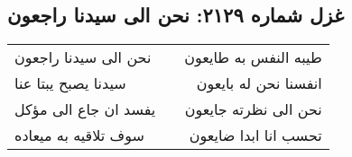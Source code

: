 \begin{center}
\section*{غزل شماره ۲۱۲۹: نحن الی سیدنا راجعون}
\label{sec:2129}
\begin{longtable}{l p{0.5cm} r}
نحن الی سیدنا راجعون
&&
طیبه النفس به طایعون
\\
سیدنا یصبح یبتا عنا
&&
انفسنا نحن له بایعون
\\
یفسد ان جاع الی مؤکل
&&
نحن الی نظرته جایعون
\\
سوف تلاقیه به میعاده
&&
تحسب انا ابدا ضایعون
\\
\end{longtable}
\end{center}
